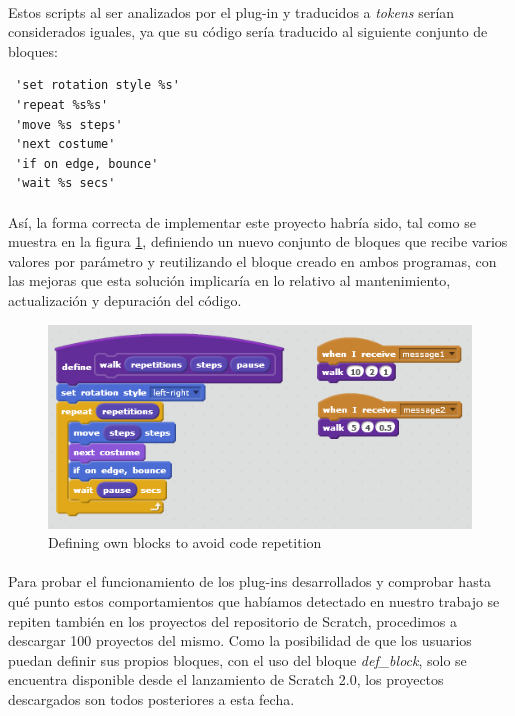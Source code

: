 \documentclass[a4paper,10pt]{article}
\begin{document}
\paragraph{}Estos scripts al ser analizados por el plug-in y traducidos a \textit{tokens} serían considerados iguales, ya que su código sería traducido al siguiente conjunto de bloques:
\begin{verbatim}
 'set rotation style %s'
 'repeat %s%s'
 'move %s steps'
 'next costume'
 'if on edge, bounce'
 'wait %s secs'
\end{verbatim}
\paragraph{} Así, la forma correcta de implementar este proyecto habría sido, tal como se muestra en la figura \ref{fig:CodeRepetition2}, definiendo un nuevo conjunto de bloques que recibe varios valores por parámetro y reutilizando el bloque creado en ambos programas, con las mejoras que esta solución implicaría en lo relativo al mantenimiento, actualización y depuración del código.

\begin{figure}
  \centering
    \includegraphics{img/CodeRepetition2.png}
  \caption{Defining own blocks to avoid code repetition}
  \label{fig:CodeRepetition2}
\end{figure}

\paragraph{}Para probar el funcionamiento de los plug-ins desarrollados y comprobar hasta qué punto estos comportamientos que habíamos detectado en nuestro trabajo se repiten también en los proyectos del repositorio de Scratch, procedimos a descargar 100 proyectos del mismo. Como la posibilidad de que los usuarios puedan definir sus propios bloques, con el uso del bloque \textit{def\_block}, solo se encuentra disponible desde el lanzamiento de Scratch 2.0, los proyectos descargados son todos posteriores a esta fecha.
\end{document}
